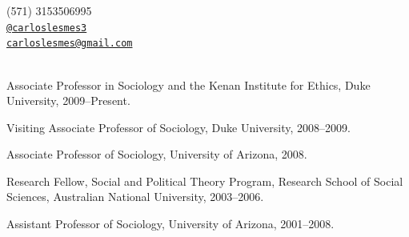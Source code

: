 \documentclass[11pt,article,oneside]{memoir}
\makeatletter
\def\myemail{carloslesmes@gmail.com}
\def\myweb{}
\def\myphone{(571) 3153506995}
\def\mytwitter{@carloslesmes3}
\makeatother
\begin{document}
\begin{minipage}[t]{2.95in}
  
\end{minipage}
\hfill     
\hfill
\begin{minipage}[t]{1.3in}
  \flushright \footnotesize  \addressblock \myphone \, \faPhone \\ 
  {\scriptsize  \texttt{\href{http://twitter.com/kjhealy}{\mytwitter}} \, \faTwitter }  \\ 
  {\scriptsize  \texttt{\href{mailto:\myemail}{\myemail}} \, \faEnvelope} \\
  {\scriptsize  \texttt{\href{\myweb}{\myweb}} \, \faGlobe}
\end{minipage}

\medskip

\reversemarginpar

\bigskip       


{}

\ind Associate Professor in Sociology and the Kenan Institute for Ethics, Duke University, 2009--Present.      

\ind Visiting Associate Professor of Sociology, Duke University, 2008--2009.

\ind Associate Professor of Sociology, University of Arizona, 2008.

\ind Research Fellow, Social and Political Theory Program,
Research School of Social Sciences, Australian National University, 2003--2006.

\ind Assistant Professor of Sociology, University of Arizona, 2001--2008.

\bigskip


\end{document}
